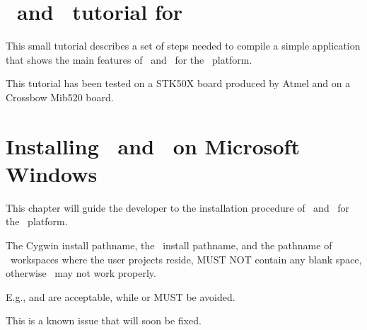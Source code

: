 \chapter{\rtd\ and \ee\ tutorial for }

This small tutorial describes a set of steps needed to compile a
simple application that shows the main features of \ee\ and \rtd\ for
the \avr\ platform.

This tutorial has been tested on a STK50X board produced by Atmel
and on a Crossbow Mib520 board.




\chapter{Installing \ee\ and \rtd\ on Microsoft Windows}
\label{cha:installing}

This chapter will guide the developer to the installation procedure of
\ee\ and \rtd\ for the \avr\ platform.

\begin{warning}
The Cygwin install pathname, the \ee\ install pathname, and the 
pathname of \rtd\ workspaces where the user projects reside, MUST NOT 
contain any blank space, otherwise \ee\ may not work properly.

E.g.,  and 
 are acceptable, while 
 or 
 MUST be avoided.

This is a known issue that will soon be fixed.
\end{warning}

